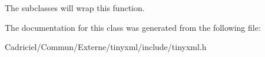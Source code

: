 The subclasses will wrap this function. 

The documentation for this class was generated from the following file\-:\begin{DoxyCompactItemize}
\item 
Cadriciel/\-Commun/\-Externe/tinyxml/include/tinyxml.\-h\end{DoxyCompactItemize}
